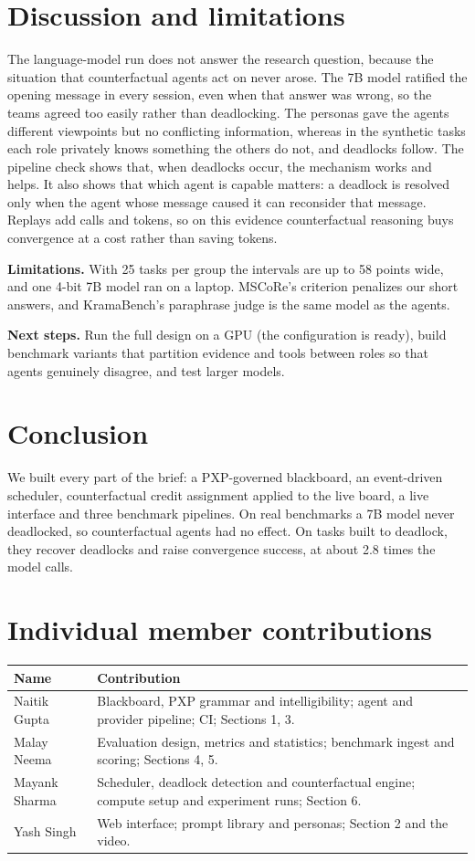 \documentclass[11pt,a4paper,twocolumn]{article}
\begin{document}
\section{Discussion and limitations}
The language-model run does not answer the research question, because the situation that
counterfactual agents act on never arose. The 7B model ratified the opening message in every
session, even when that answer was wrong, so the teams agreed too easily rather than
deadlocking. The personas gave the agents different viewpoints but no conflicting information,
whereas in the synthetic tasks each role privately knows something the others do not, and
deadlocks follow. The pipeline check shows that, when deadlocks occur, the mechanism works and
helps. It also shows that which agent is capable matters: a deadlock is resolved only when the
agent whose message caused it can reconsider that message. Replays add calls and tokens, so on
this evidence counterfactual reasoning buys convergence at a cost rather than saving tokens.

\textbf{Limitations.} With 25 tasks per group the intervals are up to 58 points wide, and one
4-bit 7B model ran on a laptop. MSCoRe's criterion penalizes our short answers, and KramaBench's
paraphrase judge is the same model as the agents.

\textbf{Next steps.} Run the full design on a GPU (the configuration is ready), build benchmark
variants that partition evidence and tools between roles so that agents genuinely disagree, and
test larger models.

\section{Conclusion}
We built every part of the brief: a PXP-governed blackboard, an event-driven scheduler,
counterfactual credit assignment applied to the live board, a live interface and three benchmark
pipelines. On real benchmarks a 7B model never deadlocked, so counterfactual agents had no
effect. On tasks built to deadlock, they recover deadlocks and raise convergence success, at
about 2.8 times the model calls.

\section*{Individual member contributions}
{\small
\begin{tabularx}{\linewidth}{@{}l X@{}}
\toprule
Name & Contribution \\
\midrule
Naitik Gupta & Blackboard, PXP grammar and intelligibility; agent and provider pipeline; CI; Sections 1, 3. \\
Malay Neema & Evaluation design, metrics and statistics; benchmark ingest and scoring; Sections 4, 5. \\
Mayank Sharma & Scheduler, deadlock detection and counterfactual engine; compute setup and experiment runs; Section 6. \\
Yash Singh & Web interface; prompt library and personas; Section 2 and the video. \\
\bottomrule
\end{tabularx}}
\end{document}
